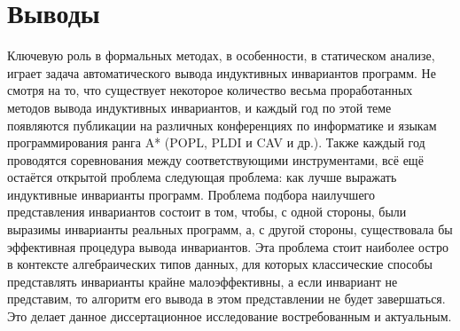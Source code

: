 \section{Выводы}\label{sec:background/conclusion}
Ключевую роль в формальных методах, в особенности, в статическом анализе, играет задача автоматического вывода индуктивных инвариантов программ.
Не смотря на то, что существует некоторое количество весьма проработанных методов вывода индуктивных инвариантов,
и каждый год по этой теме появляются публикации на различных конференциях по информатике и языкам программирования ранга A* (POPL, PLDI и CAV и др.).
Также каждый год проводятся соревнования между соответствующими инструментами,
всё ещё остаётся открытой проблема следующая проблема: как лучше выражать индуктивные инварианты программ.
Проблема подбора наилучшего представления инвариантов состоит в том, чтобы, с одной стороны, были выразимы инварианты реальных программ, а, с другой стороны, существовала бы эффективная процедура вывода инвариантов.
Эта проблема стоит наиболее остро в контексте алгебраических типов данных, для которых классические способы представлять инварианты крайне малоэффективны, а если инвариант не представим, то алгоритм его вывода в этом представлении не будет завершаться.
Это делает данное диссертационное исследование востребованным и актуальным.

